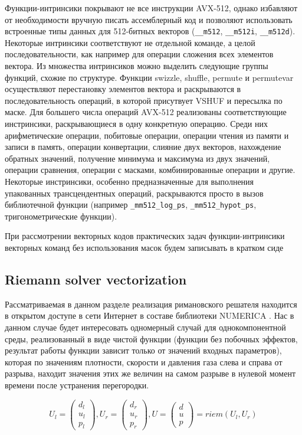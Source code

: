 \documentclass[
11pt,%
tightenlines,%
twoside,%
onecolumn,%
nofloats,%
nobibnotes,%
nofootinbib,%
superscriptaddress,%
noshowpacs,%
centertags]%
{revtex4}
\begin{document}
Функции-интринсики покрывают не все инструкции AVX-512, однако избавляют от необходимости вручную писать ассемблерный код и позволяют использовать встроенные типы данных для 512-битных векторов (\texttt{\_\_m512}, \texttt{\_\_m512i}, \texttt{\_\_m512d}).
Некоторые интринсики соответствуют не отдельной команде, а целой последовательности, как например для операции сложения всех элементов вектора.
Из множества интринсиков можно выделить следующие группы функций, схожие по структуре.
Функции swizzle, shuffle, permute и permutevar осуществляют перестановку элементов вектора и раскрываются в последовательность операций, в которой присутвует VSHUF и пересылка по маске.
Для большего числа операций AVX-512 реализованы соответствующие инстринсики, раскрывающиеся в одну конкретную операцию.
Среди них арифметические операции, побитовые операции, операции чтения из памяти и записи в память, операции конвертации, слияние двух векторов, нахождение обратных значений, получение минимума и максимума из двух значений, операции сравнения, операции с масками, комбинированные операции и другие.
Некоторые инстринсики, особенно предназначенные для выполнения упакованных трансцендентных операций, раскрываются просто в вызов библиотечной функции (например \texttt{\_mm512\_log\_ps}, \texttt{\_mm512\_hypot\_ps}, тригонометрические функции).

При рассмотрении векторных кодов практических задач функции-интринсики векторных команд без использования масок будем записывать в кратком сиде

\subsection{Riemann solver vectorization}

Рассматриваемая в данном разделе реализация римановского решателя находится в открытом доступе в сети Интернет в составе библиотеки NUMERICA \cite{Numerica}.
Нас в данном случае будет интересовать одномерный случай для однокомпонентной среды, реализованный в виде чистой функции (функции без побочных эффектов, результат работы функции зависит только от значений входных параметров), которая по значениям плотности, скорости и давления газа слева и справа от разрыва, находит значения этих же величин на самом разрыве в нулевой момент времени после устранения перегородки.

\begin{equation}\label{eq:riemann}
U_l = \left( \begin{array}{ccc} d_l \\ u_l \\ p_l \end{array} \right),
U_r = \left( \begin{array}{ccc} d_r \\ u_r \\ p_r \end{array} \right),
U = \left( \begin{array}{ccc} d \\ u \\ p \end{array} \right) = riem(U_l, U_r)
\end{equation}
\end{document}
